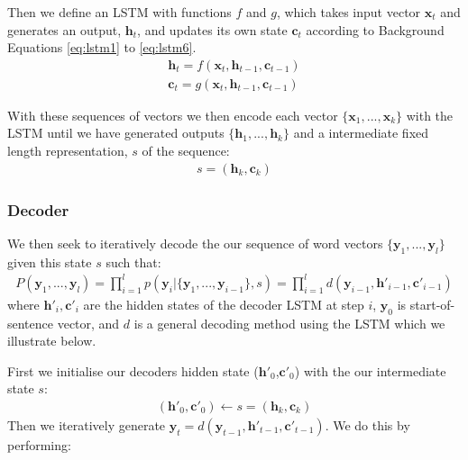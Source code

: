 Then we define an LSTM with functions $f$ and $g$, which takes input vector $\textbf{x}_t$ and generates an output, $\textbf{h}_t$, and updates its own state $\textbf{c}_t$ according to Background Equations \ref{eq:lstm1} to \ref{eq:lstm6}.
\begin{align}
    \textbf{h}_t = f(\textbf{x}_t, \textbf{h}_{t-1}, \textbf{c}_{t-1}) \label{eq:s2sh}\\
    \textbf{c}_t = g(\textbf{x}_t, \textbf{h}_{t-1}, \textbf{c}_{t-1}) \label{eq:s2sc}
\end{align}

With these sequences of vectors we then encode each vector $\{\textbf{x}_1,...,\textbf{x}_k\}$ with the LSTM until we have generated outputs $\{\textbf{h}_1,...,\textbf{h}_k\}$ and a intermediate fixed length representation, $s$ of the sequence: 
\begin{align}
     s = (\textbf{h}_k, \textbf{c}_k) \label{eq:s2s_state}
\end{align}

\subsubsection{Decoder}

We then seek to iteratively decode the our sequence of word vectors $\{\textbf{y}_1,..., \textbf{y}_l\}$ given this state $s$ such that:
\begin{align}
    P(\textbf{y}_1,...,\textbf{y}_l) = \prod_{i=1}^l p(\textbf{y}_i| \{\textbf{y}_1,...,\textbf{y}_{i-1}\}, s)  = \prod_{i=1}^ld(\mathbf{y}_{i-1}, \mathbf{h}'_{i-1},\mathbf{c}'_{i-1} )
\end{align}
where $\mathbf{h}'_{i},\mathbf{c}'_{i} $ are the hidden states of the decoder LSTM at step $i$, $\mathbf{y}_0$ is start-of-sentence vector, and $d$ is a general decoding method using the LSTM which we illustrate below.

First we initialise our decoders hidden state ($\textbf{h}'_0$,$\textbf{c}'_0$) with the our intermediate state $s$:
\begin{align}
    (\textbf{h}'_0, \textbf{c}'_0) \gets s = (\textbf{h}_k, \textbf{c}_k) \label{eq:s2s_assign}
\end{align}
Then we iteratively generate $\textbf{y}_t = d(\mathbf{y}_{t-1}, \mathbf{h}'_{t-1},\mathbf{c}'_{t-1} ) $. We do this by performing:


